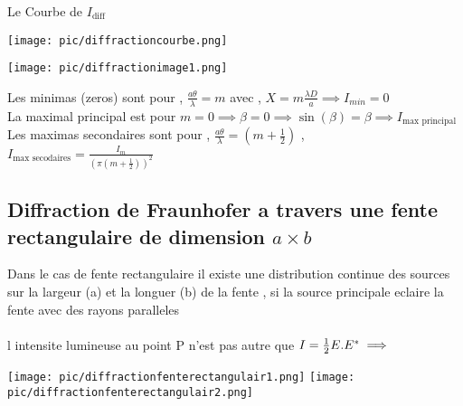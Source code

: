 \documentclass[12pt]{book}
\begin{document}
                Le Courbe de $I_{\text{diff}}$\\
                \begin{center}
                    \begin{minipage}{0.39\linewidth}
                        \texttt{[image: pic/diffractioncourbe.png]}
                    \end{minipage}
                    \begin{minipage}{0.59\linewidth}
                        \texttt{[image: pic/diffractionimage1.png]}
                    \end{minipage}
                \end{center}
                Les minimas (zeros) sont pour  , $\frac{a\theta}{\lambda}=m $ avec  , $X=m\frac{\lambda D}{a} \implies I_{min} = 0$ \\
                La maximal principal est pour  $m = 0 \implies \beta =0 \implies \sin(\beta ) = \beta \implies I_{\text{max principal}}$\\
                Les maximas secondaires sont pour  , $\frac{a\theta}{\lambda} = (m+\frac{1}{2})$  ,\\  $I_{\text{max secodaires}} = \frac{I_m}{(\pi(m+\frac{1}{2}))^2}$
            \subsection{Diffraction de Fraunhofer a travers une fente rectangulaire de dimension $a \times b$}    
                Dans le cas de fente rectangulaire il existe une distribution continue des sources sur la largeur (a) et la longuer (b) de la fente , si la source principale eclaire la fente avec des rayons paralleles \\
                \\
                l intensite lumineuse au point P n'est pas autre que $ I =\frac{1}{2}E.E^{*} \\ 
                \implies $  \\
                \begin{center}
                    \texttt{[image: pic/diffractionfenterectangulair1.png]}
                    \texttt{[image: pic/diffractionfenterectangulair2.png]}
                \end{center}
        \pagebreak
\end{document}

